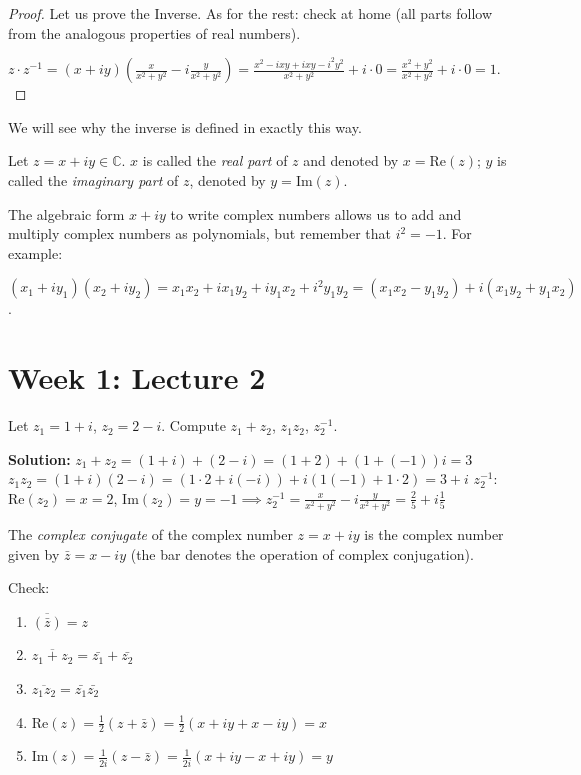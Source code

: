 \documentclass[12pt]{article}
\newcommand{\C}{\mathbb{C}}
\newcommand{\Rea}{\text{Re}}
\newcommand{\Ima}{\text{Im}}
\begin{document}
\begin{proof}
Let us prove the Inverse. As for the rest: check at home (all parts follow from the analogous properties of real numbers).

$z \cdot z^{-1} = (x+iy) \left( \frac{x}{x^2+y^2} - i \frac{y}{x^2+y^2} \right) = \frac{x^2 - ixy + ixy - i^2y^2}{x^2 + y^2} + i \cdot 0 = \frac{x^2+y^2}{x^2+y^2} + i \cdot 0= 1.$
\end{proof}

We will see why the inverse is defined in exactly this way.

\begin{definition}
Let $z = x + iy \in \C$. $x$ is called the \emph{real part} of $z$ and denoted by $x = \Rea(z)$; $y$ is called the \emph{imaginary part} of $z$, denoted by $y = \Ima(z)$.
\end{definition}

The algebraic form $x+iy$ to write complex numbers allows us to add and multiply complex numbers as polynomials, but remember that $i^2 = -1$.  For example:

$(x_1 + iy_1)(x_2 + iy_2) = x_1x_2 + ix_1y_2 + iy_1x_2 + i^2y_1y_2 = (x_1x_2 - y_1y_2) + i(x_1y_2 + y_1x_2)$.

\section{Week 1: Lecture 2}

\begin{example}
 Let $z_1=1+i$, $z_2 = 2-i$. Compute $z_1+z_2$, $z_1z_2$, $z_2^{-1}$.

\textbf{Solution:}
$z_1+z_2 = (1+i)+(2-i)=(1+2)+(1+(-1))i = 3$
$z_1z_2 = (1+i)(2-i) = (1 \cdot 2 + i(-i)) + i (1(-1)+1\cdot 2) = 3+i$
$z_2^{-1}$: $\Rea(z_2) = x=2$, $\Ima(z_2) = y=-1 \implies z_2^{-1} = \frac{x}{x^2+y^2} -i \frac{y}{x^2+y^2} = \frac{2}{5} + i \frac{1}{5}$
\end{example}

\begin{definition}
The \emph{complex conjugate} of the complex number $z = x + iy$ is the complex number given by $\bar{z} = x - iy$ (the bar denotes the operation of complex conjugation).
\end{definition}

\begin{remark}
Check:
\begin{enumerate}
    \item $\overline{(\bar{z})} = z$
    \item $\overline{z_1 + z_2} = \bar{z_1} + \bar{z_2}$
    \item $\overline{z_1 z_2} = \bar{z_1} \bar{z_2}$
    \item $\Rea(z) = \frac{1}{2}(z + \bar{z}) = \frac{1}{2}(x + iy + x - iy) = x$
    \item $\Ima(z) = \frac{1}{2i}(z - \bar{z}) = \frac{1}{2i}(x + iy - x + iy) = y$
\end{enumerate}
\end{remark}
\end{document}

